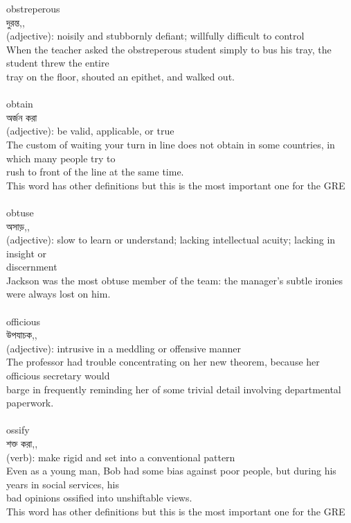 \documentclass{article}
\begin{document}
{{obstreperous}\\
{দুরন্ত,,}\\
{(adjective): noisily and stubbornly defiant; willfully difficult to control\\When the teacher asked the obstreperous student simply to bus his tray, the student threw the entire\\tray on the floor, shouted an epithet, and walked out.\\}\\
{obtain}\\
{অর্জন করা}\\
{(adjective): be valid, applicable, or true\\The custom of waiting your turn in line does not obtain in some countries, in which many people try to\\rush to front of the line at the same time.\\This word has other definitions but this is the most important one for the GRE\\}\\
{obtuse}\\
{অসাড়,,}\\
{(adjective): slow to learn or understand; lacking intellectual acuity; lacking in insight or\\discernment\\Jackson was the most obtuse member of the team: the manager's subtle ironies were always lost on him.\\}\\
{officious}\\
{উপযাচক,,}\\
{(adjective): intrusive in a meddling or offensive manner\\The professor had trouble concentrating on her new theorem, because her officious secretary would\\barge in frequently reminding her of some trivial detail involving departmental paperwork.\\}\\
{ossify}\\
{শক্ত করা,,}\\
{(verb): make rigid and set into a conventional pattern\\Even as a young man, Bob had some bias against poor people, but during his years in social services, his\\bad opinions ossified into unshiftable views.\\This word has other definitions but this is the most important one for the GRE\\}\\
}
\end{document}
